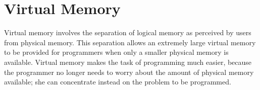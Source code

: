 \section{Virtual Memory}\label{sec:Virtual_Memory}
\begin{definition}\label{def:Virtual_Memory}
  Virtual memory involves the separation of logical memory as perceived
  by users from physical memory.
  This separation allows an extremely large virtual memory to be provided for programmers when only a smaller physical memory is available.
  Virtual memory makes the task of programming much easier, because the programmer no longer needs to worry about the amount of physical memory available; she can concentrate instead on the problem to be programmed.
\end{definition}


